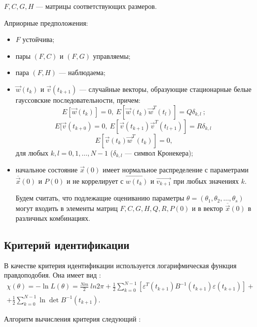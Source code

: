 \documentclass[a4paper,14pt]{extarticle}
\begin{document}
$F, C, G, H$ --- матрицы соответствующих размеров.

\bigskip
Априорные предположения:
\begin{itemize}
\item $F$ устойчива;
\item пары $(F, C)$ и $(F, G)$ управляемы;
\item пара $(F, H)$ --- наблюдаема;
\item $\vec{w}(t_k)$ и $\vec{v}(t_{k+1})$ --- случайные векторы, образующие
стационарные белые гауссовские последовательности, причем:
\[
E[\vec{w}(t_k)] = 0,\ E[\vec{w}(t_k)\vec{w}^{T}(t_l)] = Q \delta_{k,l}\ ;
\]
\[
E[\vec{v}(t_{k+0}) = 0,\ E[\vec{v}(t_{k+1})\vec{v}^{T}(t_{l+1})] = R
\delta_{k,l}\;
\]
\[
E[\vec{v}(t_k)\vec{w}^{T}(t_k)] = 0,
\]
для любых $k, l = 0, 1, \ldots, N-1$ ($\delta_{k,l}$ --- символ Кронекера);

\item начальное состояние $\vec{x}(0)$ имеет нормальное распределение с
параметрами $\overline{\vec{x}}(0)$ и $P(0)$ и не коррелирует с $\vec{w(t_k)}$
и $\vec{v_{k+1}}$ при любых значениях $k$.

Будем считать, что подлежащие оцениванию параметры $\theta = (\theta_1,
\theta_2, \ldots, \theta_s)$ могут входить в элементы матриц $F, C, G, H, Q, R,
P(0)$ и в вектор $\overline{\vec{x}}(0)$ в различных комбинациях.

\end{itemize}

\subsection{Критерий идентификации}

\newcommand{\eps}{\varepsilon}

В качестве критерия идентификации используется логарифмическая функция
правдоподобия. Она имеет вид \cite{mono}:
\begin{equation*}
\begin{split}
	\chi(\theta) = -\ln{L(\theta)} = \frac{Nm}{2}\ ln{2\pi} + \frac{1}{2}
	\sum\limits_{k=0}^{N-1} \left[ \eps^T(t_{k+1}) B^{-1}(t_{k+1}) \eps(t_{k+1}) \right]
	+ \\ + \frac{1}{2} \sum\limits_{k=0}^{N-1} \ln \det B^{-1}(t_{k+1}).
\end{split}
\end{equation*}

Алгоритм вычисления критерия следующий \cite{mono}:
\end{document}
